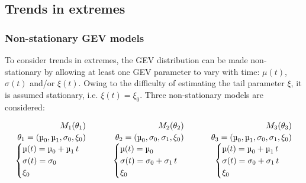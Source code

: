 ﻿\documentclass[hess, manuscript]{copernicus}
\begin{document}
\subsection{Trends in extremes}\label{trends-in-extremes}

\subsubsection{Non-stationary GEV models}\label{non-stationary-gev}

To consider trends in extremes, the GEV distribution can be made non-stationary
by allowing at least one GEV parameter to vary with time: $\mu(t)$, $\sigma(t)$
and/or $\xi(t)$. Owing to the difficulty of estimating the tail parameter $\xi$,
it is assumed stationary, i.e. $\xi(t) = \xi_0$. Three non-stationary models are
considered:

\[
\begin{array}{c@{\qquad}c@{\qquad}c}
\begin{array}{c}
\begin{aligned}
M_1(\theta_1)\\[-0.2ex]
\theta_1 = (\mu_0, \mu_1, \sigma_0, \xi_0)
\end{aligned}\\[0.4ex]
\begin{cases}
\mu(t) = \mu_0 + \mu_1\, t \\
\sigma(t) = \sigma_0 \\
\xi_0
\end{cases}
\end{array}
&
\begin{array}{c}
\begin{aligned}
M_2(\theta_2)\\[-0.2ex]
\theta_2 = (\mu_0, \sigma_0, \sigma_1, \xi_0)
\end{aligned}\\[0.4ex]
\begin{cases}
\mu(t) = \mu_0 \\
\sigma(t) = \sigma_0 + \sigma_1\, t \\
\xi_0
\end{cases}
\end{array}
&
\begin{array}{c}
\begin{aligned}
M_3(\theta_3)\\[-0.2ex]
\theta_3 = (\mu_0, \mu_1, \sigma_0, \sigma_1, \xi_0)
\end{aligned}\\[0.4ex]
\begin{cases}
\mu(t) = \mu_0 + \mu_1\, t \\
\sigma(t) = \sigma_0 + \sigma_1\, t \\
\xi_0
\end{cases}
\end{array}
\end{array}
\]
\end{document}
